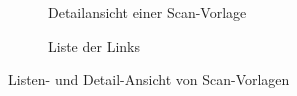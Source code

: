 \documentclass[notables, nomenclature, oneside, 150]{HSMW-Thesis}
\begin{document}
\begin{figure}[th]
\begin{subfigure}[t]{0.3\textwidth}
        			\caption{Detailansicht einer Scan-Vorlage}
        			\label{fig:liste2}
    			\end{subfigure}
    			\begin{subfigure}[t]{0.3\textwidth}
        			\caption{Liste der Links}
        			\label{fig:liste3}
    			\end{subfigure}
    			\caption{Listen- und Detail-Ansicht von Scan-Vorlagen}
				\label{fig:vorlagen}
			\end{figure}
			
\end{document}
